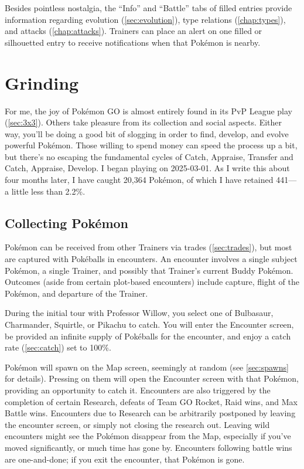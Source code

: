 Besides pointless nostalgia, the ``Info'' and ``Battle'' tabs of filled entries
  provide information regarding evolution (\autoref{sec:evolution}), type
  relations (\autoref{chap:types}), and attacks (\autoref{chap:attacks}).
Trainers can place an alert on one filled or silhouetted entry to receive
  notifications when that Pokémon is nearby.

\section{Grinding}
\label{sec:grinding}
For me, the joy of Pokémon GO is almost entirely found in its PvP League play (\autoref{sec:3x3}).
Others take pleasure from its collection and social aspects.
Either way, you'll be doing a good bit of slogging in order to find, develop,
  and evolve powerful Pokémon.
Those willing to spend money can speed the process up a bit, but there's
  no escaping the fundamental cycles of Catch, Appraise, Transfer and
  Catch, Appraise, Develop. 
I began playing on 2025-03-01.
As I write this about four months later, I have caught 20,364 Pokémon, of which
  I have retained 441---a little less than 2.2\%.

\subsection{Collecting Pokémon}
\label{subsec:getmons}
Pokémon can be received from other Trainers via trades (\autoref{sec:trades}),
  but most are captured with Pokéballs in encounters.
An encounter involves a single subject Pokémon, a single Trainer,
  and possibly that Trainer's current Buddy Pokémon.
Outcomes (aside from certain plot-based encounters) include capture, flight of
  the Pokémon, and departure of the Trainer.

During the initial tour with Professor Willow, you select one of
 Bulbasaur, Charmander, Squirtle, or Pikachu to catch.
You will enter the Encounter screen, be provided an infinite supply of
  Pokéballs for the encounter, and enjoy a catch rate (\autoref{sec:catch}) set to 100\%.

Pokémon will spawn on the Map screen, seemingly at random (see \autoref{sec:spawns} for details).
Pressing on them will open the Encounter screen with that Pokémon,
  providing an opportunity to catch it.
Encounters are also triggered by the completion of certain Research,
  defeats of Team GO Rocket, Raid wins, and Max Battle wins.
Encounters due to Research can be arbitrarily postponed by leaving the encounter screen,
  or simply not closing the research out.
Leaving wild encounters might see the Pokémon disappear from the Map, especially
  if you've moved significantly, or much time has gone by.
Encounters following battle wins are one-and-done; if you exit the encounter,
  that Pokémon is gone.


